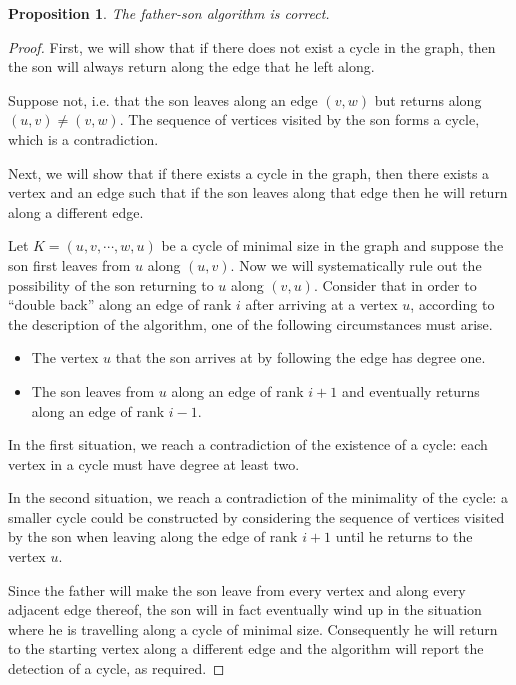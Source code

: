\documentclass[11pt,letterpaper]{article}
\newtheorem{proposition}{Proposition}
\begin{document}
\begin{proposition}
    The father-son algorithm is correct.
\end{proposition}

\begin{proof}
    First, we will show that if there does not exist a cycle in the graph, then
    the son will always return along the edge that he left along.

    Suppose not, i.e. that the son leaves along an edge $(v, w)$ but returns
    along $(u, v) \neq (v, w)$. The sequence of vertices visited by the son
    forms a cycle, which is a contradiction.

    Next, we will show that if there exists a cycle in the graph, then there
    exists a vertex and an edge such that if the son leaves along that edge
    then he will return along a different edge.

    Let $K = (u, v, \cdots, w, u)$ be a cycle of minimal size in the graph and
    suppose the son first leaves from $u$ along $(u, v)$. Now we will
    systematically rule out the possibility of the son returning to $u$ along
    $(v, u)$. Consider that in order to ``double back'' along an edge of rank
    $i$ after arriving at a vertex $u$, according to the description of the
    algorithm, one of the following circumstances must arise.

    \begin{itemize}
        \item
            The vertex $u$ that the son arrives at by following the edge has
            degree one.

        \item
            The son leaves from $u$ along an edge of rank $i+1$ and eventually
            returns along an edge of rank $i-1$.
    \end{itemize}

    In the first situation, we reach a contradiction of the existence of a
    cycle: each vertex in a cycle must have degree at least two.

    In the second situation, we reach a contradiction of the minimality of the
    cycle: a smaller cycle could be constructed by considering the sequence of
    vertices visited by the son when leaving along the edge of rank $i+1$ until
    he returns to the vertex $u$.

    Since the father will make the son leave from every vertex and along every
    adjacent edge thereof, the son will in fact eventually wind up in the
    situation where he is travelling along a cycle of minimal size.
    Consequently he will return to the starting vertex along a different edge
    and the algorithm will report the detection of a cycle, as required.
\end{proof}
\end{document}
